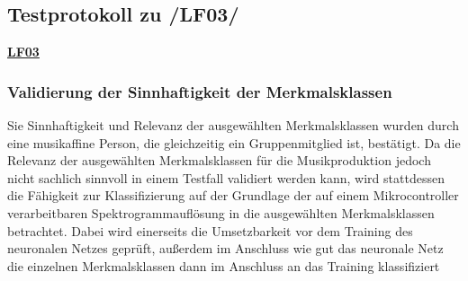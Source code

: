 \subsection{Testprotokoll zu /LF03/}
\textbf{\hyperlink{lf-nn-01}{LF03}}

\subsubsection{Validierung der Sinnhaftigkeit der Merkmalsklassen}
Sie Sinnhaftigkeit und Relevanz der ausgewählten Merkmalsklassen wurden durch eine musikaffine Person, die gleichzeitig ein Gruppenmitglied ist, bestätigt.
Da die Relevanz der ausgewählten Merkmalsklassen für die Musikproduktion jedoch nicht sachlich sinnvoll in einem Testfall validiert werden kann, wird stattdessen die Fähigkeit zur Klassifizierung auf der Grundlage der auf einem Mikrocontroller verarbeitbaren Spektrogrammauflösung in die ausgewählten Merkmalsklassen betrachtet. Dabei wird einerseits die Umsetzbarkeit vor dem Training des neuronalen Netzes geprüft, außerdem im Anschluss wie gut das neuronale Netz die einzelnen Merkmalsklassen dann im Anschluss an das Training klassifiziert

